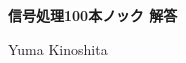 \documentclass[10pt]{jsarticle}
\begin{document}
\begin{center}
  {\bf \Large 信号処理100本ノック 解答}
\end{center}
\begin{flushright}
  Yuma Kinoshita
\end{flushright}
\setlength{\leftmarginii}{3pt}

% 

\clearpage


\clearpage


% 
\end{document}
